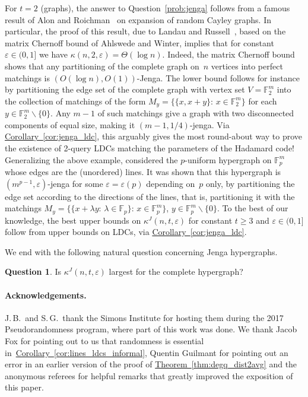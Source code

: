 \documentclass[11pt]{article}
\numberwithin{equation}{section}
\theoremstyle{definition}
\newtheorem{question}[theorem]{Question}
\theoremstyle{plain}
\newcommand{\expref}[2]{\hyperref[#2]{#1~\ref{#2}}}
\newcommand{\st}{:\,} %
\newcommand{\eps}{\varepsilon}
\newcommand{\F}{{\mathbb{F}}}
\begin{document}
For $t = 2$ (graphs), the answer to Question~\ref{prob:jenga} follows from
%
a famous result  %
of Alon and Roichman~\cite{Alon:1994a} on expansion of random Cayley
%
%
%
graphs.  In particular, the  %
%
proof of this result, due to Landau and Russell~\cite{Landau:2004}, %
based on the matrix Chernoff bound of Ahlswede and Winter,  %
%
implies that for constant $\eps\in (0,1]$ %
we have $\kappa(n, 2,\eps) = \Theta(\log n)$.
Indeed, the matrix Chernoff bound shows that any partitioning of the complete graph on~$n$ vertices into perfect matchings is $(O(\log n),O(1))$-Jenga.
The lower bound follows for instance by partitioning the edge set of the complete graph with vertex set $V = \F_2^m$ into the collection of matchings of the form $M_y = \big\{\{x, x+y\} \st x\in \F_2^m\big\}$ for each $y\in \F_2^m\smallsetminus\{0\}$.
Any $m-1$ of such matchings give a graph with two disconnected components of equal size, making it $(m-1, 1/4)$-jenga.
Via \expref{Corollary}{cor:jenga_ldc}, this arguably gives the most round-about way to prove the existence of 2-query LDCs matching the parameters of the Hadamard code!
Generalizing the above example, \cite{BrietRao:2016} considered the $p$-uniform hypergraph on $\F_p^m$ whose edges are the (unordered)  lines. %
It was shown that this hypergraph is $(m^{p-1}, \eps)$-jenga for some $\eps =  \eps(p)$ depending on~$p$ only, by partitioning the edge set according to the directions of the lines, that is, partitioning it with the matchings $M_y = \big\{\{x + \lambda y\st \lambda\in \F_p\} \st x\in \F_p^m\big\}$, $y\in \F_p^m\smallsetminus\{0\}$.
To the best of our knowledge, the best upper bounds on $\kappa^J(n,t,\eps)$ for constant $t\geq 3$ and $\eps \in (0,1]$ follow from upper bounds on LDCs, via \expref{Corollary}{cor:jenga_ldc}.

We end with the following natural question concerning Jenga hypergraphs.

\begin{question}
Is $\kappa^J(n,t,\eps)$ largest for the complete hypergraph?
\end{question}

%
\paragraph{Acknowledgements.}
J.\,B.\ and S.\,G.\ thank the Simons Institute for hosting them during the 2017 Pseudorandomness program, where part of this work was done.
We thank Jacob Fox for pointing out to us that randomness is essential in~\expref{Corollary}{cor:lines_ldcs_informal}, Quentin Guilmant for pointing out an error in an earlier version of the proof of \expref{Theorem}{thm:degq_dist2avg} and the anonymous referees for helpful remarks that greatly improved the exposition of this paper.
\end{document}
